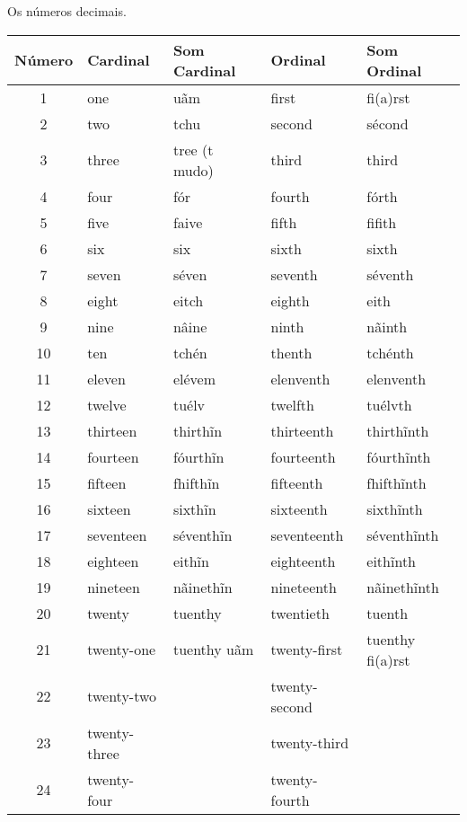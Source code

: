 \documentclass{book}
\begin{document}
Os números decimais.
\begin{center}
  \begin{tabular}{ |c|p{3cm}|p{3cm}|p{3cm}|p{3cm}| }
    \hline
    Número& Cardinal& Som Cardinal& Ordinal& Som Ordinal \\
    \hline
    1& one& uãm& first& fi(a)rst \\
    \hline
    2& two& tchu& second& sécond \\
    \hline
    3& three& tree (t mudo)& third& third \\
    \hline
    4& four& fór& fourth& fórth \\
    \hline
    5& five& faive& fifth& fifith \\
    \hline
    6& six& six& sixth& sixth \\
    \hline
    7& seven& séven& seventh& séventh \\
    \hline
    8& eight& eitch& eighth& eith \\
    \hline
    9& nine& nâine& ninth& nãinth \\
    \hline
    10& ten& tchén& thenth& tchénth \\
    \hline
    11& eleven& elévem& elenventh& elenventh \\
    \hline
    12& twelve& tuélv& twelfth& tuélvth \\
    \hline
    13& thirteen& thirthĩn& thirteenth& thirthĩnth \\
    \hline
    14& fourteen& fóurthĩn& fourteenth& fóurthĩnth \\
    \hline
    15& fifteen& fhifthĩn& fifteenth& fhifthĩnth \\
    \hline
    16& sixteen& sixthĩn& sixteenth& sixthĩnth \\
    \hline
    17& seventeen& séventhĩn& seventeenth& séventhĩnth \\
    \hline
    18& eighteen& eithĩn& eighteenth& eithĩnth \\
    \hline
    19& nineteen& nãinethĩn& nineteenth& nãinethĩnth  \\
    \hline
    20& twenty& tuenthy& twentieth& tuenth \\
    \hline
    21& twenty-one& tuenthy uãm& twenty-first& tuenthy fi(a)rst \\
    \hline
    22& 	twenty-two&     & twenty-second& \\
    \hline
    23& 	twenty-three& 	& twenty-third& \\
    \hline
    24& 	twenty-four& 	& twenty-fourth& \\
    \hline

\end{tabular}
\end{center}
\end{document}
